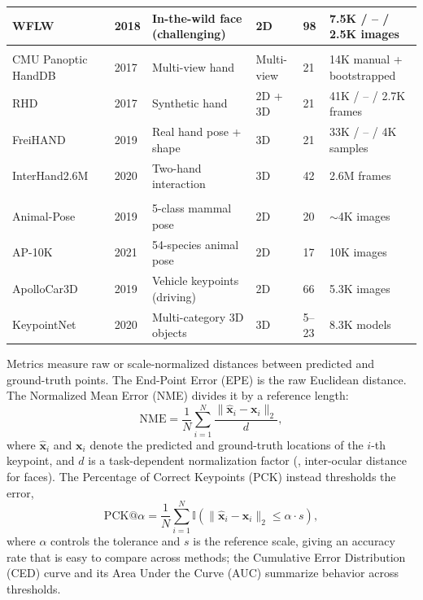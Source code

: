 \begin{table}[!t]
\begin{tabular}{L{0.22\textwidth} C{0.06\textwidth} L{0.23\textwidth} C{0.11\textwidth} C{0.08\textwidth} L{0.23\textwidth}}
WFLW~\cite{wu2018look}                 & 2018 & In-the-wild face (challenging) & 2D & 98 & 7.5K / -- / 2.5K images \\
\midrule
{}  \\
CMU Panoptic HandDB~\cite{simon2017hand} & 2017 & Multi-view hand & Multi-view & 21 & 14K manual + bootstrapped \\
RHD~\cite{zimmermann2017learning}       & 2017 & Synthetic hand & 2D + 3D & 21 & 41K / -- / 2.7K frames \\
FreiHAND~\cite{zimmermann2019freihand}  & 2019 & Real hand pose + shape & 3D & 21 & 33K / -- / 4K samples \\
InterHand2.6M~\cite{moon2020interhand2} & 2020 & Two-hand interaction & 3D & 42 & 2.6M frames \\
\midrule
{}  \\
Animal-Pose~\cite{cao2019cross}         & 2019 & 5-class mammal pose & 2D & 20 & $\sim$4K images \\
AP-10K~\cite{yu2021ap}                  & 2021 & 54-species animal pose & 2D & 17 & 10K images \\
ApolloCar3D~\cite{song2019apollocar3d} & 2019 & Vehicle keypoints (driving) & 2D & 66 & 5.3K images \\
KeypointNet~\cite{you2020keypointnet}   & 2020 & Multi-category 3D objects & 3D & 5--23 & 8.3K models \\
\bottomrule
\end{tabular}
\end{table}

Metrics measure raw or scale-normalized distances between predicted and ground-truth points. The End-Point Error (EPE) is the raw Euclidean distance. The Normalized Mean Error (NME) divides it by a reference length:
\begin{equation}
\mathrm{NME} = \frac{1}{N} \sum_{i=1}^{N} \frac{\lVert \hat{\mathbf{x}}_i - \mathbf{x}_i \rVert_2}{d},
\end{equation}
where $\hat{\mathbf{x}}_i$ and $\mathbf{x}_i$ denote the predicted and ground-truth locations of the $i$-th keypoint, and $d$ is a task-dependent normalization factor (\eg, inter-ocular distance for faces).
The Percentage of Correct Keypoints (PCK) instead thresholds the error,
\begin{equation}
\mathrm{PCK@}\alpha = \frac{1}{N} \sum_{i=1}^{N}
\mathbb{I}\!\left( \lVert \hat{\mathbf{x}}_i - \mathbf{x}_i \rVert_2 \le \alpha \cdot s \right),
\end{equation}
where $\alpha$ controls the tolerance and $s$ is the reference scale, giving an accuracy rate that is easy to compare across methods; the Cumulative Error Distribution (CED) curve and its Area Under the Curve (AUC) summarize behavior across thresholds.

